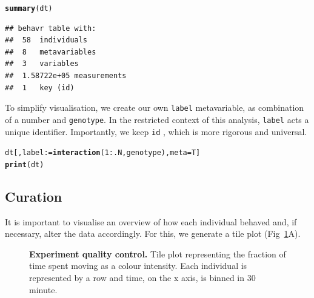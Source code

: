 \documentclass[10pt,letterpaper]{article}\usepackage[]{graphicx}\usepackage[]{color}
\makeatletter
\newcommand{\hlnum}[1]{\textcolor[rgb]{0.686,0.059,0.569}{#1}}%
\newcommand{\hlopt}[1]{\textcolor[rgb]{0,0,0}{#1}}%
\newcommand{\hlstd}[1]{\textcolor[rgb]{0.345,0.345,0.345}{#1}}%
\newcommand{\hlkwb}[1]{\textcolor[rgb]{0.69,0.353,0.396}{#1}}%
\newcommand{\hlkwc}[1]{\textcolor[rgb]{0.333,0.667,0.333}{#1}}%
\newcommand{\hlkwd}[1]{\textcolor[rgb]{0.737,0.353,0.396}{\textbf{#1}}}%
\newenvironment{kframe}{%
 \def\at@end@of@kframe{}%
 \ifinner\ifhmode%
  \def\at@end@of@kframe{\end{minipage}}%
  \begin{minipage}{\columnwidth}%
 \fi\fi%
 \def\FrameCommand##1{\hskip\@totalleftmargin \hskip-\fboxsep
 \colorbox{shadecolor}{##1}\hskip-\fboxsep
     \hskip-\linewidth \hskip-\@totalleftmargin \hskip\columnwidth}%
 \MakeFramed {\advance\hsize-\width
   \@totalleftmargin\z@ \linewidth\hsize
   \@setminipage}}%
 {\par\unskip\endMakeFramed%
 \at@end@of@kframe}
\newenvironment{knitrout}{}{} %
\makeatother
\begin{document}
\begin{knitrout}
\color{fgcolor}\begin{kframe}
\begin{alltt}
\hlkwd{summary}\hlstd{(dt)}
\end{alltt}
\begin{verbatim}
## behavr table with:
##  58	individuals
##  8	metavariables
##  3	variables
##  1.58722e+05	measurements
##  1	key (id)
\end{verbatim}
\end{kframe}
\end{knitrout}

To simplify visualisation, we create our own \texttt{label} metavariable, as combination of a number and \texttt{genotype}.
In the restricted context of this analysis, \texttt{label} acts a unique identifier.
Importantly, we keep \texttt{id} , which is more rigorous and universal.



\begin{knitrout}
\color{fgcolor}\begin{kframe}
\begin{alltt}
\hlstd{dt[, label} \hlkwb{:=} \hlkwd{interaction}\hlstd{(}\hlnum{1}\hlopt{:}\hlstd{.N, genotype),} \hlkwc{meta}\hlstd{=T]}
\hlkwd{print}\hlstd{(dt)}
\end{alltt}
\end{kframe}
\end{knitrout}


\subsection*{Curation}
It is important to visualise an overview of how each individual behaved and, if necessary, alter the data accordingly. For this, we generate a tile plot (Fig~\ref{fig:fig-3}A).

\begin{figure}[!h]
	\caption{{\bf Experiment quality control.}
			Tile plot representing the fraction of time spent moving as a colour intensity.
			Each individual is represented by a row and time, on the x axis, is binned in 30 minute.}
	\label{fig:fig-3}
\end{figure}
\end{document}
